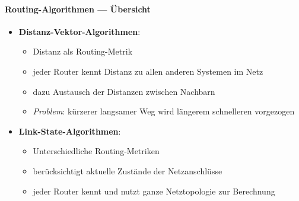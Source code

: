 \paragraph{Routing-Algorithmen --- Übersicht}
\begin{itemize}
  \item \textbf{Distanz-Vektor-Algorithmen}:
  \begin{itemize}
    \item Distanz als Routing-Metrik
    \item jeder Router kennt Distanz zu allen anderen Systemen im Netz
    \item dazu Austausch der Distanzen zwischen Nachbarn
    \item \emph{Problem}: kürzerer langsamer Weg wird längerem schnelleren vorgezogen
  \end{itemize}
  \item \textbf{Link-State-Algorithmen}:
  \begin{itemize}
    \item Unterschiedliche Routing-Metriken
    \item berücksichtigt aktuelle Zustände der Netzanschlüsse
    \item jeder Router kennt und nutzt ganze Netztopologie zur Berechnung
  \end{itemize}
\end{itemize}

